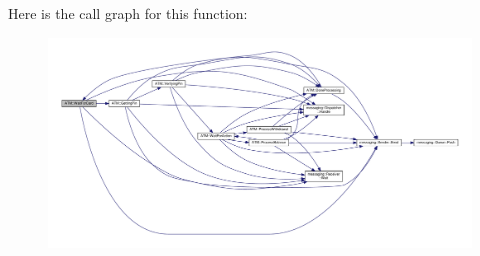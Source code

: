 Here is the call graph for this function\-:
\nopagebreak
\begin{figure}[H]
\begin{center}
\leavevmode
\includegraphics[width=350pt]{classATM_ae530dbaa0e091b13f919542d002ef216_cgraph}
\end{center}
\end{figure}




